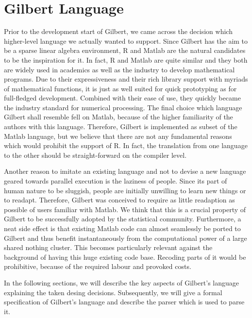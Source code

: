 \chapter{Gilbert Language}
\label{cha:gilbertlanguage}


Prior to the development start of Gilbert, we came across the decision which higher-level language we actually wanted to support.
Since Gilbert has the aim to be a sparse linear algebra environment, R and Matlab are the natural candidates to be the inspiration for it.
In fact, R and Matlab are quite similar and they both are widely used in academics as well as the industry to develop mathematical programs.
Due to their expressiveness and their rich library support with myriads of mathematical functions, it is just as well suited for quick prototyping as for full-fledged development.
Combined with their ease of use, they quickly became the industry standard for numerical processing.
The final choice which language Gilbert shall resemble fell on Matlab, because of the higher familiarity of the authors with this language.
Therefore, Gilbert is implemented as subset of the Matlab language, but we believe that there are not any fundamental reasons which would prohibit the support of R.
In fact, the translation from one language to the other should be straight-forward on the compiler level.

Another reason to imitate an existing language and not to devise a new language geared towards parallel execution is the laziness of people.
Since its part of human nature to be sluggish, people are initially unwilling to learn new things or to readapt.
Therefore, Gilbert was conceived to require as little readaption as possible of users familiar with Matlab.
We think that this is a crucial property of Gilbert to be successfully adopted by the statistical community.
Furthermore, a neat side effect is that existing Matlab code can almost seamlessly be ported to Gilbert and thus benefit instantaneously from the computational power of a large shared nothing cluster.
This becomes particularly relevant against the background of having this huge existing code base.
Recoding parts of it would be prohibitive, because of the required labour and provoked costs.

In the following sections, we will describe the key aspects of Gilbert's language explaining the taken desing decisions.
Subsequently, we will give a formal specification of Gilbert's language and describe the parser which is used to parse it.

